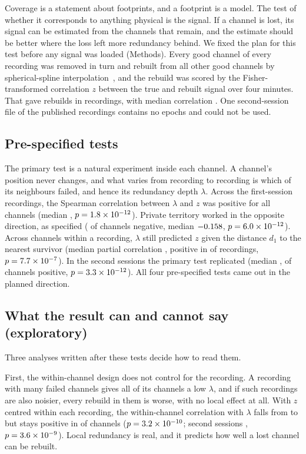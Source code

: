 \documentclass[11pt]{amsart}
\theoremstyle{definition}
\theoremstyle{remark}
\begin{document}
Coverage is a statement about footprints, and a footprint is a model. The
test of whether it corresponds to anything physical is the signal. If a
channel is lost, its signal can be estimated from the channels that remain,
and the estimate should be better where the loss left more redundancy
behind. We fixed the plan for this test before any signal was loaded (Methods).
Every good channel of every recording was removed in turn and rebuilt from
all other good channels by spherical-spline interpolation~\cite{Perrin1989},
and the rebuild was scored by the Fisher-transformed correlation $z$ between
the true and rebuilt signal over four minutes. That gave \sigRows{} rebuilds
in \sigRec{} recordings, with median correlation \sigMedianR{}. One
second-session file of the \nRec{} published recordings contains no epochs and
could not be used.

\subsection*{Pre-specified tests}
The primary test is a natural experiment inside each channel. A channel's
position never changes, and what varies from recording to recording is which
of its neighbours failed, and hence its redundancy depth $\lambda$. Across the
first-session recordings, the Spearman correlation between $\lambda$ and $z$
was positive for all \sigPPos{} channels (median \sigPRho,
$p=1.8\times 10^{-12}$). Private territory worked in the opposite direction, as specified
(\sigSoneNeg{} of \sigSoneCh{} channels negative, median $-0.158$,
$p=6.0\times 10^{-12}$). Across channels within a recording, $\lambda$ still predicted
$z$ given the distance $d_1$ to the nearest survivor (median partial
correlation \sigStwoRho, positive in \sigStwoPos{} of \sigStwoRec{} recordings,
$p=7.7\times 10^{-7}$). In the second sessions the primary test replicated (median
\sigSthreeRho, \sigSthreePos{} of \sigSthreeCh{} channels positive,
$p=3.3\times 10^{-12}$). All four pre-specified tests came out in the planned
direction.

\subsection*{What the result can and cannot say (exploratory)}
Three analyses written after these tests decide how to read them.

First, the within-channel design does not control for the recording. A
recording with many failed channels gives all of its channels a low $\lambda$,
and if such recordings are also noisier, every rebuild in them is worse,
with no local effect at all. With $z$ centred within each recording, the
within-channel correlation with $\lambda$ falls from \xwLamRho{} to
\xcLamRho{} but stays positive in \xcLamPos{} of \xcLamCh{} channels
($p=3.2\times 10^{-10}$; second sessions \xdLamRho, $p=3.6\times 10^{-9}$). Local redundancy is
real, and it predicts how well a lost channel can be rebuilt.
\end{document}
